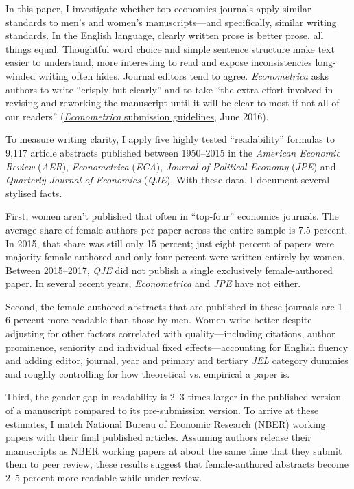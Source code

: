 In this paper, I investigate whether top economics journals apply similar standards to men's and women's manuscripts---and specifically, similar writing standards. In the English language, clearly written prose is better prose, all things equal. Thoughtful word choice and simple sentence structure make text easier to understand, more interesting to read and expose inconsistencies long-winded writing often hides. Journal editors tend to agree. \emph{Econometrica} asks authors to write ``crisply but clearly'' and to take ``the extra effort involved in revising and reworking the manuscript until it will be clear to most if not all of our readers'' (\href{http://www.econometricsociety.org/publications/econometrica/information-authors/instructions-submitting-articles}{\emph{Econometrica} submission guidelines}, June 2016).

To measure writing clarity, I apply five highly tested ``readability'' formulas to 9,117 article abstracts published between 1950--2015 in the \emph{American Economic Review} (\emph{AER}), \emph{Econometrica} (\emph{ECA}), \emph{Journal of Political Economy} (\emph{JPE}) and \emph{Quarterly Journal of Economics} (\emph{QJE}). With these data, I document several stylised facts.

First, women aren't published that often in ``top-four'' economics journals. The average share of female authors per paper across the entire sample is 7.5 percent. In 2015, that share was still only 15 percent; just eight percent of papers were majority female-authored and only four percent were written entirely by women. Between 2015--2017, \emph{QJE} did not publish a single exclusively female-authored paper. In several recent years, \emph{Econometrica} and \emph{JPE} have not either.

Second, the female-authored abstracts that are published in these journals are 1--6 percent more readable than those by men. Women write better despite adjusting for other factors correlated with quality---including citations, author prominence, seniority and individual fixed effects---accounting for English fluency and adding editor, journal, year and primary and tertiary \emph{JEL} category dummies and roughly controlling for how theoretical vs. empirical a paper is.

Third, the gender gap in readability is 2--3 times larger in the published version of a manuscript compared to its pre-submission version. To arrive at these estimates, I match National Bureau of Economic Research (NBER) working papers with their final published articles. Assuming authors release their manuscripts as NBER working papers at about the same time that they submit them to peer review, these results suggest that female-authored abstracts become 2--5 percent more readable while under review.

